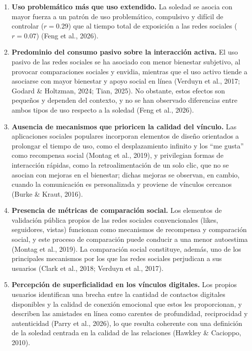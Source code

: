 \begin{enumerate}
    \item \textbf{Uso problemático más que uso extendido.} La soledad se asocia con mayor fuerza a un patrón de uso problemático, compulsivo y difícil de controlar ($r = 0.29$) que al tiempo total de exposición a las redes sociales ($r = 0.07$) (Feng et al., 2026).
    \item \textbf{Predominio del consumo pasivo sobre la interacción activa.} El uso pasivo de las redes sociales se ha asociado con menor bienestar subjetivo, al provocar comparaciones sociales y envidia, mientras que el uso activo tiende a asociarse con mayor bienestar y apoyo social en línea (Verduyn et al., 2017; Godard \& Holtzman, 2024; Tian, 2025). No obstante, estos efectos son pequeños y dependen del contexto, y no se han observado diferencias entre ambos tipos de uso respecto a la soledad (Feng et al., 2026).
    \item \textbf{Ausencia de mecanismos que prioricen la calidad del vínculo.} Las aplicaciones sociales populares incorporan elementos de diseño orientados a prolongar el tiempo de uso, como el desplazamiento infinito y los ``me gusta'' como recompensa social (Montag et al., 2019), y privilegian formas de interacción rápidas, como la retroalimentación de un solo clic, que no se asocian con mejoras en el bienestar; dichas mejoras se observan, en cambio, cuando la comunicación es personalizada y proviene de vínculos cercanos (Burke \& Kraut, 2016).
    \item \textbf{Presencia de métricas de comparación social.} Los elementos de validación pública propios de las redes sociales convencionales (likes, seguidores, vistas) funcionan como mecanismos de recompensa y comparación social, y este proceso de comparación puede conducir a una menor autoestima (Montag et al., 2019). La comparación social constituye, además, uno de los principales mecanismos por los que las redes sociales perjudican a sus usuarios (Clark et al., 2018; Verduyn et al., 2017).
    \item \textbf{Percepción de superficialidad en los vínculos digitales.} Los propios usuarios identifican una brecha entre la cantidad de contactos digitales disponibles y la calidad de conexión emocional que estos les proporcionan, y describen las amistades en línea como carentes de profundidad, reciprocidad y autenticidad (Parry et al., 2026), lo que resulta coherente con una definición de la soledad centrada en la calidad de las relaciones (Hawkley \& Cacioppo, 2010).
\end{enumerate}
